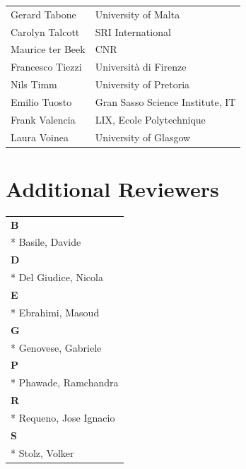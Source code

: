\documentclass[]{llncs}
\begin{document}
\begin{longtable}{p{}p{}}
Gerard Tabone & University of Malta\\

Carolyn Talcott & SRI  International\\

Maurice ter Beek & CNR\\

Francesco Tiezzi & Universit\`a di Firenze\\

Nils Timm & University of Pretoria\\

Emilio Tuosto & Gran Sasso Science Institute, IT\\

Frank Valencia & LIX, Ecole Polytechnique\\

Laura Voinea & University of Glasgow\\

\end{longtable}

\clearpage

\section*{Additional Reviewers}
\begin{longtable}{l}
\textbf{B} \\*
Basile, Davide
\\
\textbf{D} \\*
Del Giudice, Nicola
\\
\textbf{E} \\*
Ebrahimi, Masoud
\\
\textbf{G} \\*
Genovese, Gabriele
\\
\textbf{P} \\*
Phawade, Ramchandra
\\
\textbf{R} \\*
Requeno, Jose Ignacio
\\
\textbf{S} \\*
Stolz, Volker
\\
\end{longtable}
\end{document}
